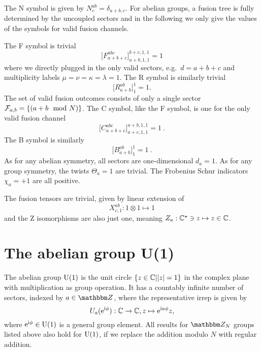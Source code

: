 The N symbol is given by $N^{ab}_c = \delta_{a + b, c}$.
%
For abelian groups, a fusion tree is fully determined by the uncoupled sectors and in the following we only give the values of the symbols for valid fusion channels.

The F symbol is trivial
\begin{equation}
    \big[ F^{abc}_{a + b + c} \big]^{b + c,1,1}_{a + b,1,1} = 1
\end{equation}
where we directly plugged in the only valid sectors, e.g.~$d=a+b+c$ and multiplicity labels $\mu = \nu = \kappa = \lambda = 1$.
%
The R symbol is similarly trivial
\begin{equation}
    \big[ R^{ab}_{a+b} \big]^1_1 = 1
    .
\end{equation}
The set of valid fusion outcomes consists of only a single sector $\mathcal{F}_{a,b} = \set{(a + b \mod N)}$.
%
The C symbol, like the F symbol, is one for the only valid fusion channel
\begin{equation}
    \big[ C^{abc}_{a+b+c} \big]^{a+b,1,1}_{a+c,1,1} = 1
    ~.
\end{equation}
%
The B symbol is similarly
\begin{equation}
    \big[ B^{ab}_{a+b} \big]^1_1 = 1
    ~.
\end{equation}
%
As for any abelian symmetry, all sectors are one-dimensional $d_a = 1$.
%
As for any group symmetry, the twists $\Theta_a = 1$ are trivial.
%
The Frobenius Schur indicators $\chi_a = +1$ are all positive.

The fusion tensors are trivial, given by linear extension of
\begin{equation}
    X^{ab}_{c,1} : 1 \otimes 1 \mapsto 1
\end{equation}
and the Z isomorphisms are also just one, meaning $Z_a: \mathbb{C}^\star \ni z \mapsto z \in \mathbb{C}$.

\section{The abelian group U(1)}
\label{sec:topo_data:U1}

The abelian group $\mathrm{U}(1)$ is the unit circle $\setdef{z \in \Cbb}{\abs{z} = 1}$ in the complex plane with multiplication as group operation.
%
It has a countably infinite number of sectors, indexed by $a \in \Zbb$, where the representative irrep is given by
\begin{equation}
    U_a(\mathrm{e}^{\mathrm{i}\phi}) : \mathbb{C} \to \mathbb{C} , z \mapsto \mathrm{e}^{\mathrm{i} a \phi} z,
\end{equation}
where $\mathrm{e}^{\mathrm{i}\phi}\in\mathrm{U}(1)$ is a general group element.
%
All results for $\Zbb_N$ groups listed above also hold for $\mathrm{U}(1)$, if we replace the addition modulo $N$ with regular addition.


